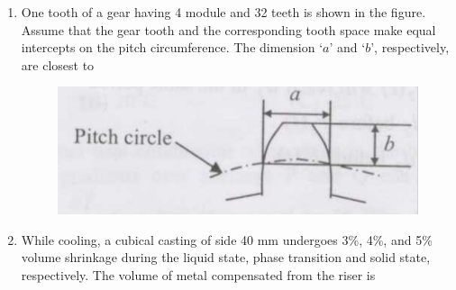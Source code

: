 \documentclass[journal,12pt,onecolumn]{IEEEtran}
\begin{document}
\begin{enumerate}[resume]
    \item One tooth of a gear having 4 module and 32 teeth is shown in the figure. Assume that the gear tooth and the corresponding tooth space make equal intercepts on the pitch circumference. The dimension `$a$' and `$b$', respectively, are closest to

          \begin{figure}[H]
              \centering
              \includegraphics[scale=0.3]{q62}
              \caption{}
              \label{q62}
          \end{figure}

          \begin{enumerate}
          \end{enumerate}

    \item While cooling, a cubical casting of side 40 mm undergoes 3\%, 4\%, and 5\% volume shrinkage during the liquid state, phase transition and solid state, respectively. The volume of metal compensated from the riser is\\

          \begin{enumerate}
          \end{enumerate}


\end{enumerate}
\end{document}
